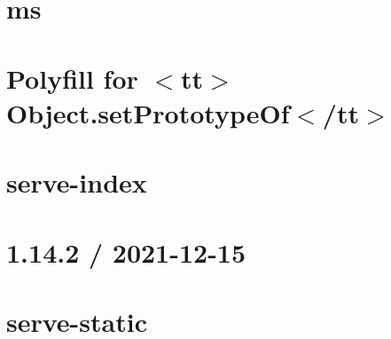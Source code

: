 \documentclass[twoside]{book}
\newcommand{\+}{\discretionary{\mbox{\scriptsize$\hookleftarrow$}}{}{}}
\begin{document}
\chapter{ms}
\label{md__c___users_vaishnavi_jadhav__desktop__developer_code_mean_stack_example_client_node_modules_s145f84765c0b98f38ae02b598b97a104}

\chapter{Polyfill for \texorpdfstring{$<$}{<}tt\texorpdfstring{$>$}{>}Object.\+set\+Prototype\+Of\texorpdfstring{$<$}{<}/tt\texorpdfstring{$>$}{>}}
\label{md__c___users_vaishnavi_jadhav__desktop__developer_code_mean_stack_example_client_node_modules_s192e5d0baa81493d5ab3ee245dfc0862}

\chapter{serve-\/index}
\label{md__c___users_vaishnavi_jadhav__desktop__developer_code_mean_stack_example_client_node_modules_serve_index__r_e_a_d_m_e}

\chapter{1.14.2 / 2021-\/12-\/15}
\label{md__c___users_vaishnavi_jadhav__desktop__developer_code_mean_stack_example_client_node_modules_serve_static__h_i_s_t_o_r_y}

\chapter{serve-\/static}
\label{md__c___users_vaishnavi_jadhav__desktop__developer_code_mean_stack_example_client_node_modules_serve_static__r_e_a_d_m_e}

\end{document}
